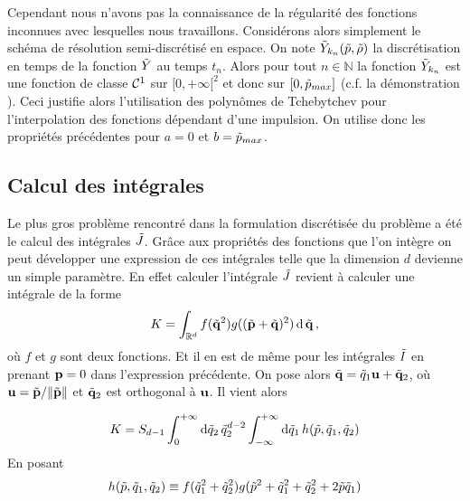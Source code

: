 \documentclass[10pt]{article}
\begin{document}
\begin{multicols}{2}

Cependant nous n'avons pas la connaissance de la régularité des fonctions inconnues avec lesquelles nous travaillons.
Considérons alors simplement le schéma de résolution semi-discrétisé en espace. On note $\tilde{Y}_{k_n}(\tilde{p}, \tilde{\rho})$ la discrétisation en temps de la fonction $\tilde{Y}$ au temps $t_n$. Alors pour tout $n \in \mathbb{N}$ la fonction $\tilde{Y}_{k_n}$ est une fonction de classe $\mathcal{C}^1$ sur $[0, +\infty[^2$ et donc sur $[0, \tilde{p}_{max}]$ (c.f. la démonstration ). Ceci justifie alors l'utilisation des polynômes de Tchebytchev pour l'interpolation des fonctions dépendant d'une impulsion. On utilise donc les propriétés précédentes pour $a=0$ et $b = \tilde{p}_{max}$. 

 \vspace*{11pt}

\subsection{Calcul des intégrales}

Le plus gros problème rencontré dans la formulation discrétisée du problème a été le calcul des intégrales $\tilde{J}$. 
Grâce aux propriétés des fonctions que l'on intègre on peut développer une expression de ces intégrales telle que la dimension $d$ devienne un simple paramètre. En effet calculer l'intégrale $\tilde{J}$ revient à calculer une intégrale de la forme 
\begin{equation}
K = \int_{\mathbb{R}^d} f(\tilde{{\bf q}}^2)g((\tilde{{\bf p}}+\tilde{{\bf q}})^2) \, \text{d} \, \tilde{{\bf q}} \, ,
\end{equation}
où $f$ et $g$ sont deux fonctions. Et il en est de même pour les intégrales $\tilde{I}$ en prenant ${\bf p} = 0$ dans l'expression précédente. On pose alors $\tilde{{\bf q}} = \tilde{q}_1 {\bf u} + \tilde{{\bf q}}_2$, où ${\bf u} = \tilde{{\bf p}}/\|\tilde{{\bf p}}\|$ et $\tilde{{\bf q}}_2$ est orthogonal à ${\bf u}$. Il vient alors

\begin{equation}
K = S_{d-1} \int_0^{+\infty} \text{d}\tilde{q}_2 \, \tilde{q}_2^{d-2} \int_{-\infty}^{+\infty} \text{d}\tilde{q}_1 \, h (\tilde{p}, \tilde{q}_1, \tilde{q}_2)
\end{equation}
En posant
\begin{equation}
h (\tilde{p}, \tilde{q}_1, \tilde{q}_2) \equiv f(\tilde{q}_1^2 + \tilde{q}_2^2) g(\tilde{p}^2 + \tilde{q}_1^2 + \tilde{q}_2^2 + 2\tilde{p}\tilde{q}_1)
\end{equation}


\end{multicols}
\end{document}

